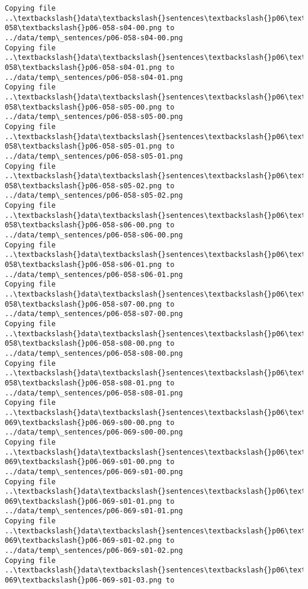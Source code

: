 \documentclass[11pt]{article}
\begin{document}
\begin{Verbatim}[commandchars=\\\{\}]
Copying file ..\textbackslash{}data\textbackslash{}sentences\textbackslash{}p06\textbackslash{}p06-058\textbackslash{}p06-058-s04-00.png to
../data/temp\_sentences/p06-058-s04-00.png
Copying file ..\textbackslash{}data\textbackslash{}sentences\textbackslash{}p06\textbackslash{}p06-058\textbackslash{}p06-058-s04-01.png to
../data/temp\_sentences/p06-058-s04-01.png
Copying file ..\textbackslash{}data\textbackslash{}sentences\textbackslash{}p06\textbackslash{}p06-058\textbackslash{}p06-058-s05-00.png to
../data/temp\_sentences/p06-058-s05-00.png
Copying file ..\textbackslash{}data\textbackslash{}sentences\textbackslash{}p06\textbackslash{}p06-058\textbackslash{}p06-058-s05-01.png to
../data/temp\_sentences/p06-058-s05-01.png
Copying file ..\textbackslash{}data\textbackslash{}sentences\textbackslash{}p06\textbackslash{}p06-058\textbackslash{}p06-058-s05-02.png to
../data/temp\_sentences/p06-058-s05-02.png
Copying file ..\textbackslash{}data\textbackslash{}sentences\textbackslash{}p06\textbackslash{}p06-058\textbackslash{}p06-058-s06-00.png to
../data/temp\_sentences/p06-058-s06-00.png
Copying file ..\textbackslash{}data\textbackslash{}sentences\textbackslash{}p06\textbackslash{}p06-058\textbackslash{}p06-058-s06-01.png to
../data/temp\_sentences/p06-058-s06-01.png
Copying file ..\textbackslash{}data\textbackslash{}sentences\textbackslash{}p06\textbackslash{}p06-058\textbackslash{}p06-058-s07-00.png to
../data/temp\_sentences/p06-058-s07-00.png
Copying file ..\textbackslash{}data\textbackslash{}sentences\textbackslash{}p06\textbackslash{}p06-058\textbackslash{}p06-058-s08-00.png to
../data/temp\_sentences/p06-058-s08-00.png
Copying file ..\textbackslash{}data\textbackslash{}sentences\textbackslash{}p06\textbackslash{}p06-058\textbackslash{}p06-058-s08-01.png to
../data/temp\_sentences/p06-058-s08-01.png
Copying file ..\textbackslash{}data\textbackslash{}sentences\textbackslash{}p06\textbackslash{}p06-069\textbackslash{}p06-069-s00-00.png to
../data/temp\_sentences/p06-069-s00-00.png
Copying file ..\textbackslash{}data\textbackslash{}sentences\textbackslash{}p06\textbackslash{}p06-069\textbackslash{}p06-069-s01-00.png to
../data/temp\_sentences/p06-069-s01-00.png
Copying file ..\textbackslash{}data\textbackslash{}sentences\textbackslash{}p06\textbackslash{}p06-069\textbackslash{}p06-069-s01-01.png to
../data/temp\_sentences/p06-069-s01-01.png
Copying file ..\textbackslash{}data\textbackslash{}sentences\textbackslash{}p06\textbackslash{}p06-069\textbackslash{}p06-069-s01-02.png to
../data/temp\_sentences/p06-069-s01-02.png
Copying file ..\textbackslash{}data\textbackslash{}sentences\textbackslash{}p06\textbackslash{}p06-069\textbackslash{}p06-069-s01-03.png to

\end{Verbatim}
\end{document}
